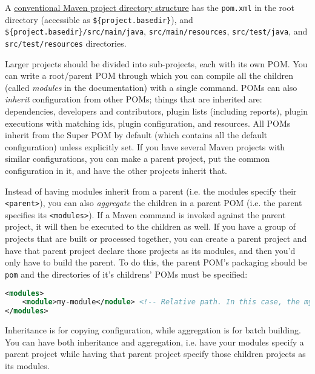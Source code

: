 \documentclass[8pt, table, xcdraw]{article}%
\begin{document}
A \href{https://maven.apache.org/guides/introduction/introduction-to-the-standard-directory-layout.html}{conventional Maven project directory structure} has the \lstinline{pom.xml} in the root directory (accessible as \lstinline|${project.basedir}|), and \lstinline|${project.basedir}/src/main/java|, \lstinline{src/main/resources}, \lstinline{src/test/java}, and \lstinline{src/test/resources} directories.

Larger projects should be divided into sub-projects, each with its own POM. You can write a root/parent POM through which you can compile all the children (called \emph{modules} in the documentation) with a single command. POMs can also \emph{inherit} configuration from other POMs; things that are inherited are: dependencies, developers and contributors, plugin lists (including reports), plugin executions with matching ids, plugin configuration, and resources. All POMs inherit from the Super POM by default (which contains all the default configuration) unless explicitly set. If you have several Maven projects with similar configurations, you can make a parent project, put the common configuration in it, and have the other projects inherit that.

Instead of having modules inherit from a parent (i.e. the modules specify their \lstinline{<parent>}), you can also \emph{aggregate} the children in a parent POM (i.e. the parent specifies its \lstinline{<modules>}). If a Maven command is invoked against the parent project, it will then be executed to the children as well. If you have a group of projects that are built or processed together, you can create a parent project and have that parent project declare those projects as its modules, and then you'd only have to build the parent. To do this, the parent POM's packaging should be \lstinline{pom} and the directories of it's childrens' POMs must be specified:

\begin{lstlisting}[language=XML]
<modules>
    <module>my-module</module> <!-- Relative path. In this case, the my-module subdirectory is in this POM's directory. By convention, the module's artifactId is the directory name -->
</modules>
\end{lstlisting}

Inheritance is for copying configuration, while aggregation is for batch building. You can have both inheritance and aggregation, i.e. have your modules specify a parent project while having that parent project specify those children projects as its modules.
\end{document}

